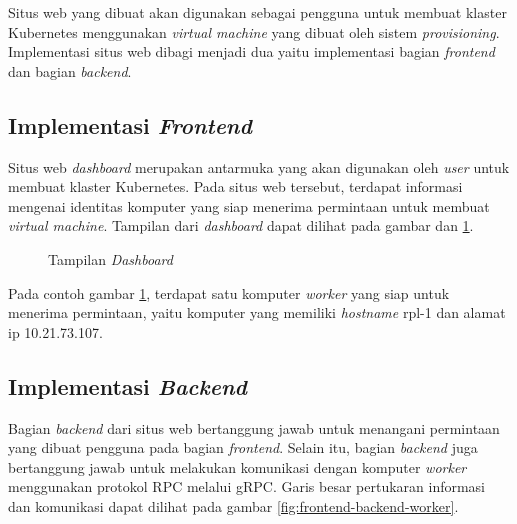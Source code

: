 Situs web yang dibuat akan digunakan sebagai pengguna untuk membuat
klaster Kubernetes menggunakan \emph{virtual machine} yang dibuat
oleh sistem \emph{provisioning}. Implementasi situs web dibagi menjadi
dua yaitu implementasi bagian \emph{frontend} dan bagian \emph{backend}.

\subsection{Implementasi \emph{Frontend}}
\label{subsec:implementas-frontend}

Situs web \emph{dashboard} merupakan antarmuka yang akan digunakan oleh \emph{user}
untuk membuat klaster Kubernetes. Pada situs web tersebut, terdapat
informasi mengenai identitas komputer yang siap
menerima permintaan untuk membuat \emph{virtual machine}.
Tampilan dari \emph{dashboard} dapat dilihat pada gambar
dan \ref{fig:dashboard-with-node}.

\begin{figure}[H]
  \centering
  \caption{Tampilan \emph{Dashboard}}
  \label{fig:dashboard-with-node}
\end{figure}

Pada contoh gambar \ref{fig:dashboard-with-node}, terdapat satu komputer \emph{worker}
yang siap untuk menerima permintaan, yaitu komputer yang memiliki \emph{hostname} rpl-1 dan alamat
ip 10.21.73.107.

\subsection{Implementasi \emph{Backend}}
\label{subsec:implementas-backend}

Bagian \emph{backend} dari situs web bertanggung jawab untuk menangani permintaan
yang dibuat pengguna pada bagian \emph{frontend}. Selain itu, bagian \emph{backend}
juga bertanggung jawab untuk melakukan komunikasi dengan komputer \emph{worker} menggunakan
protokol RPC melalui gRPC. Garis besar pertukaran informasi dan komunikasi
dapat dilihat pada gambar \ref{fig:frontend-backend-worker}.

